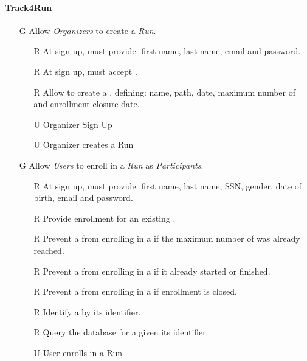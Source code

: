 \documentclass[../../../rasd.tex]{subfiles}
\begin{document}
\paragraph{Track4Run}
\begin{itemize}
    \item[G\subs{8}]Allow \textit{Organizers} to create a \textit{Run}.
    \begin{itemize}
        \item[R\subs{39}]At sign up,  must provide: first name, last name, email and password.
        \item[R\subs{40}]At sign up,  must accept .
        \item[R\subs{41}]Allow  to create a , defining: name, path, date, maximum number of  and enrollment closure date. 
        \\
        \item[U\subs{13}]Organizer Sign Up  
        \item[U\subs{14}]Organizer creates a Run
    \end{itemize}

    \item[G\subs{9}]Allow \textit{Users} to enroll in a \textit{Run} as \textit{Participants}. 
    \begin{itemize}
    \item[R\subs{2}]At sign up,  must provide: first name, last name, SSN, gender, date of birth, email and password.
        \item[R\subs{42}]Provide  enrollment for an existing .
        \item[R\subs{43}]Prevent a  from enrolling in a  if the maximum number of  was already reached.
        \item[R\subs{44}]Prevent a  from enrolling in a  if it already started or finished.
        \item[R\subs{45}]Prevent a  from enrolling in a  if enrollment is closed.
        \item[R\subs{47}]Identify a  by its identifier.
        \item[R\subs{48}]Query the database for a  given its identifier.
        \\
        \item[U\subs{15}]User enrolls in a Run
    \end{itemize}


\end{itemize}
\end{document}
